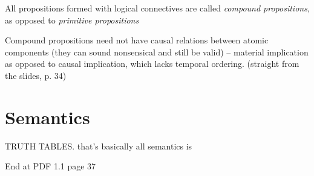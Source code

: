 \documentclass[12pt]{article}
\begin{document}
All propositions formed with logical connectives are called \textit{compound propositions},
as opposed to \textit{primitive propositions}

Compound propositions need not have causal
relations between atomic components (they
can sound nonsensical and still be valid) –
material implication as opposed to causal
implication, which lacks temporal ordering. (straight from the slides, p. 34)

\section{Semantics}

TRUTH TABLES. that's basically all semantics is

End at PDF 1.1 page 37
\end{document}

